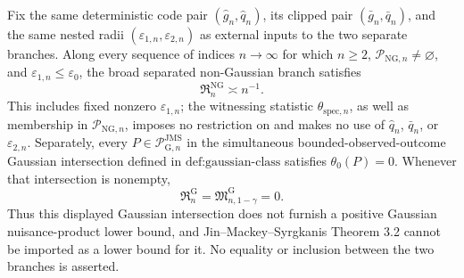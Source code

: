 Fix the same deterministic code pair \((\widehat g_n,\widehat q_n)\), its clipped pair \((\bar g_n,\bar q_n)\), and the same nested radii \((\varepsilon_{1,n},\varepsilon_{2,n})\) as external inputs to the two separate branches. Along every sequence of indices \(n\to\infty\) for which \(n\ge2\), \(\mathcal P_{\mathrm{NG},n}\neq\varnothing\), and \(\varepsilon_{1,n}\le\varepsilon_0\), the broad separated non-Gaussian branch satisfies
\[
 \mathfrak R_n^{\mathrm{NG}}\asymp n^{-1}.
\]
This includes fixed nonzero \(\varepsilon_{1,n}\); the witnessing statistic \(\widehat\theta_{\mathrm{spec},n}\), as well as membership in \(\mathcal P_{\mathrm{NG},n}\), imposes no restriction on and makes no use of \(\widehat q_n\), \(\bar q_n\), or \(\varepsilon_{2,n}\). Separately, every \(P\in\mathcal P_{\mathrm G,n}^{\mathrm{JMS}}\) in the simultaneous bounded-observed-outcome Gaussian intersection defined in \(\text{def:gaussian-class}\) satisfies \(\theta_0(P)=0\). Whenever that intersection is nonempty,
\[
 \mathfrak R_n^{\mathrm G}
 =\mathfrak M_{n,1-\gamma}^{\mathrm G}
 =0.
\]
Thus this displayed Gaussian intersection does not furnish a positive Gaussian nuisance-product lower bound, and Jin--Mackey--Syrgkanis Theorem 3.2 cannot be imported as a lower bound for it. No equality or inclusion between the two branches is asserted.